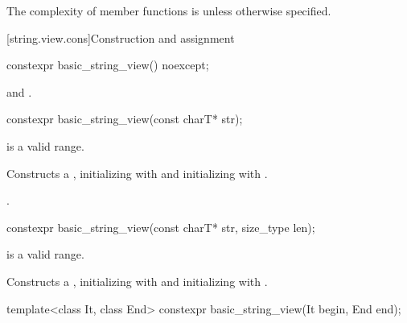 \pnum
The complexity of  member functions is 
unless otherwise specified.

[string.view.cons]{Construction and assignment}

%
\begin{itemdecl}
constexpr basic_string_view() noexcept;
\end{itemdecl}

\begin{itemdescr}
\pnum
\ensures
{} and .
\end{itemdescr}

%
\begin{itemdecl}
constexpr basic_string_view(const charT* str);
\end{itemdecl}

\begin{itemdescr}
\pnum
\expects
{} is a valid range.

\pnum
\effects
Constructs a , initializing  with 
and initializing  with .

\pnum
\complexity
{}.
\end{itemdescr}

%
\begin{itemdecl}
constexpr basic_string_view(const charT* str, size_type len);
\end{itemdecl}

\begin{itemdescr}
\pnum
\expects
{} is a valid range.

\pnum
\effects
Constructs a , initializing  with 
and initializing  with .
\end{itemdescr}

%
\begin{itemdecl}
template<class It, class End>
  constexpr basic_string_view(It begin, End end);
\end{itemdecl}

